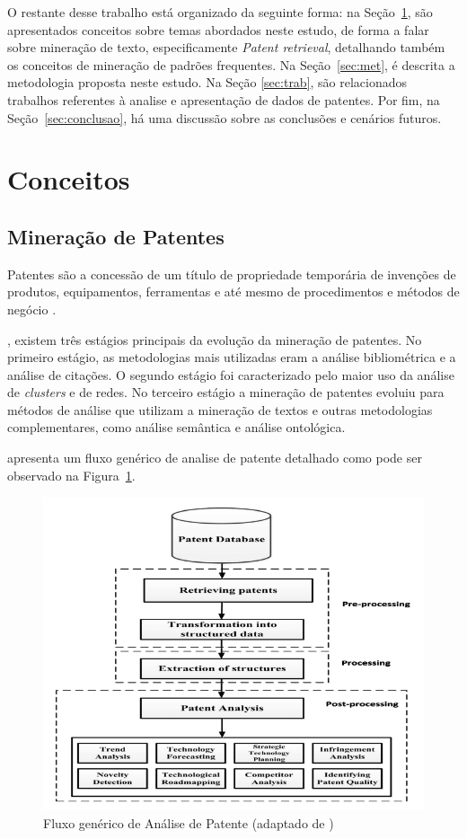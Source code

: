 \documentclass[12pt]{article}
\begin{document}
O restante desse trabalho está organizado da seguinte forma: na Seção~\ref{sec:conceitos}, são apresentados conceitos sobre temas abordados neste estudo, de forma a falar sobre  mineração de texto, especificamente \textit{Patent retrieval}, detalhando também os conceitos de mineração de padrões frequentes. 
Na Seção~\ref{sec:met}, é descrita a metodologia proposta neste estudo.
Na Seção \ref{sec:trab}, são relacionados trabalhos referentes à analise e apresentação de dados de patentes.
Por fim, na Seção~\ref{sec:conclusao}, há uma discussão sobre as conclusões e cenários futuros.

\section{Conceitos}
\label{sec:conceitos}

\subsection{Mineração de Patentes}
\label{subsec:patmining}

Patentes são a concessão de um título de propriedade temporária de invenções de produtos, equipamentos, ferramentas e até mesmo de procedimentos e métodos de negócio \citep{mansfield1986patents}.

\cite{madani2016evolution}, existem três estágios principais da
evolução da mineração de patentes. No primeiro estágio, as metodologias mais
utilizadas eram a análise bibliométrica e a análise de citações. O segundo estágio foi
caracterizado pelo maior uso da análise de \textit{clusters} e de redes. No terceiro estágio a
mineração de patentes evoluiu para métodos de análise que utilizam a mineração de
textos e outras metodologias complementares, como análise semântica e análise
ontológica.

\cite{liu2011development} apresenta um fluxo genérico de analise de patente detalhado como pode ser observado na Figura~\ref{fig:fluxo}.

\begin{figure}[!h]
\centering
\includegraphics[width=.8\textwidth]{Workflow.PNG}
\caption{Fluxo genérico de Análise de Patente (adaptado de \cite{abbas2014literature})}
\label{fig:fluxo}
\end{figure}
\end{document}
